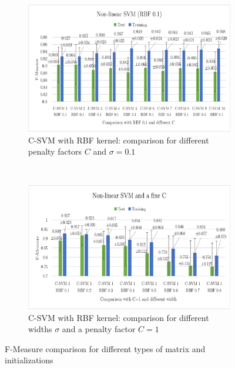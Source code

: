 \documentclass[a4paper,10pt]{article}
\begin{document}
 \begin{figure}[H]
 \centering
    \begin{subfigure}[t]{0.4\textwidth}
      \centering
      \includegraphics[width=\textwidth]{pictures/non-linear-SVM_fixeRBF}
      \caption{C-SVM with RBF kernel: comparison for different penalty factors $C$  and $\sigma = 0.1$}
      \label{fig:non-linear-SVM_fixeRBF}
     \end{subfigure}
      ~
    \begin{subfigure}[t]{0.4\textwidth}
      \centering
      \includegraphics[width=\textwidth]{pictures/non-linear-SVM_fixeC}
      \caption{C-SVM with RBF kernel: comparison for different widths $\sigma$ and a penalty factor $C = 1$}
      \label{fig:non-linear-SVM_fixeC}
     \end{subfigure}
     \caption{F-Measure comparison for different types of matrix and initializations}\label{fig:non-linear-SVM_fixe}
\end{figure}
\end{document}
